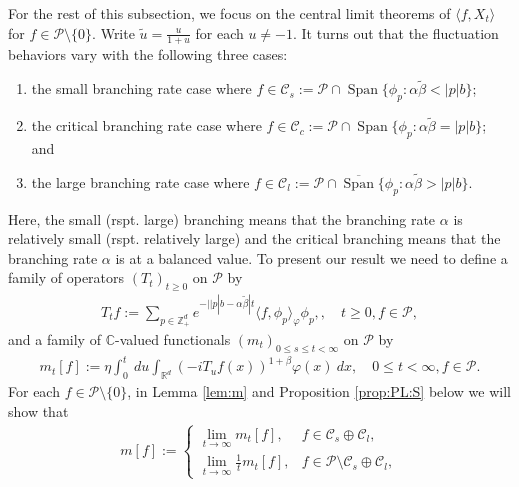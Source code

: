 \documentclass[12pt,a4paper]{amsart}
\theoremstyle{plain}
\theoremstyle{definition}
\numberwithin{equation}{section}
\begin{document}
For the rest of this subsection, we focus on the central limit theorems of $\langle f, X_t\rangle$ for $f\in \mathcal P\setminus \{0\}$.
Write $\tilde u = \frac{u}{ 1+ u}$ for each $u \neq -1$.
It turns out that the fluctuation behaviors vary with the following three cases:
\begin{enumerate}
\item
  the small branching rate case where $f \in \mathcal C_s   := \mathcal P \cap \operatorname{Span} \{ \phi_p: \alpha \tilde \beta < |p| b \}$;
\item
  the critical branching rate case where $f \in \mathcal C_c   := \mathcal P \cap \operatorname{Span} \{ \phi_p : \alpha \tilde \beta = |p| b \} $; and
\item
  the large branching rate case  where $f \in \mathcal C_l   := \mathcal P \cap \overline{\operatorname{Span}} \{ \phi_p: \alpha \tilde \beta > |p| b \}$.
\end{enumerate}
Here, the small (rspt. large) branching means that the branching rate $\alpha$ is relatively small (rspt. relatively large) and the critical branching means that the branching rate $\alpha$ is at a balanced value.
To present our result we need to define a family of operators $(T_t)_{t\geq 0}$ on $\mathcal P$ by
    \begin{align}
      \label{eq:I:R:1}
      T_t f
      := \sum_{p \in \mathbb Z_+^d} e^{-| |p|b - \alpha \tilde \beta |t} \langle f, \phi_p \rangle_{\varphi} \phi_p,
      ,\quad t\geq 0, f\in \mathcal P,
    \end{align}
    and a family of $\mathbb C$-valued functionals $(m_t)_{0 \leq s \leq t < \infty}$ on $\mathcal P$ by
    \begin{align}
      \label{eq:I:R:2}
      m_t[f]
      := \eta \int_0^t ~du \int_{\mathbb R^d} (-iT_u f(x))^{1+\beta} \varphi(x) ~dx
      , \quad 0 \leq t< \infty, f\in \mathcal P.
    \end{align}
    For each $f\in \mathcal P\setminus \{0\}$, in Lemma \ref{lem:m} and Proposition \ref{prop:PL:S} below we will show that
    \begin{align}
      \label{eq:I:R:3}
      m[f]
      := \begin{cases}
        \lim_{t\to \infty} m_t[f], &
        f \in \mathcal C_s \oplus \mathcal C_l, \\
        \lim_{t\to \infty} \frac{1}{t} m_t[f], & f\in \mathcal P \setminus \mathcal C_s \oplus \mathcal C_l,
        \end{cases}
    \end{align}
\end{document}
